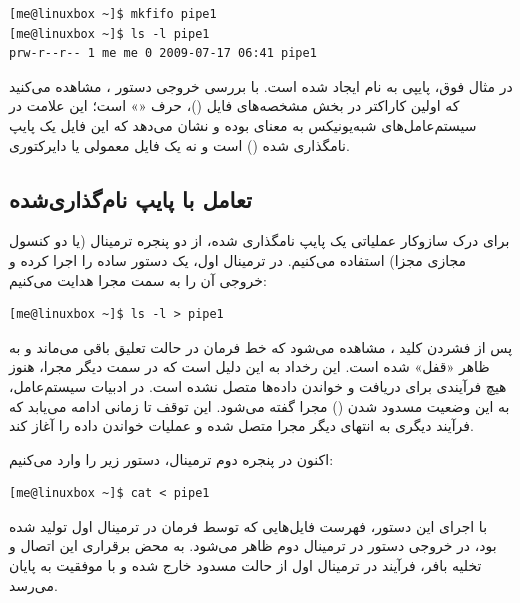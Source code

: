 \begin{latin}
\begin{lstlisting}
[me@linuxbox ~]$ mkfifo pipe1
[me@linuxbox ~]$ ls -l pipe1
prw-r--r-- 1 me me 0 2009-07-17 06:41 pipe1
\end{lstlisting}
\end{latin}

در مثال فوق، پایپی به نام  ایجاد شده است. با بررسی خروجی دستور ، مشاهده می‌کنید که اولین کاراکتر در بخش مشخصه‌های فایل ()، حرف «» است؛ این علامت در سیستم‌عامل‌های شبه‌یونیکس به معنای  بوده و نشان می‌دهد که این فایل یک پایپ نامگذاری شده () است و نه یک فایل معمولی یا دایرکتوری.

\subsection{تعامل با پایپ نام‌گذاری‌شده}

برای درک سازوکار عملیاتی یک پایپ نامگذاری شده، از دو پنجره ترمینال (یا دو کنسول مجازی مجزا) استفاده می‌کنیم. در ترمینال اول، یک دستور ساده را اجرا کرده و خروجی آن را به سمت مجرا هدایت می‌کنیم:

\begin{latin}
\begin{lstlisting}
[me@linuxbox ~]$ ls -l > pipe1

\end{lstlisting}
\end{latin}

پس از فشردن کلید ، مشاهده می‌شود که خط فرمان در حالت تعلیق باقی می‌ماند و به ظاهر «قفل» شده است. این رخداد به این دلیل است که در سمت دیگر مجرا، هنوز هیچ فرآیندی برای دریافت و خواندن داده‌ها متصل نشده است. در ادبیات سیستم‌عامل، به این وضعیت مسدود شدن () مجرا گفته می‌شود. این توقف تا زمانی ادامه می‌یابد که فرآیند دیگری به انتهای دیگر مجرا متصل شده و عملیات خواندن داده را آغاز کند.

اکنون در پنجره دوم ترمینال، دستور زیر را وارد می‌کنیم:

\begin{latin}
\begin{lstlisting}
[me@linuxbox ~]$ cat < pipe1
\end{lstlisting}
\end{latin}

با اجرای این دستور، فهرست فایل‌هایی که توسط فرمان  در ترمینال اول تولید شده بود، در خروجی دستور  در ترمینال دوم ظاهر می‌شود. به محض برقراری این اتصال و تخلیه بافر، فرآیند  در ترمینال اول از حالت مسدود خارج شده و با موفقیت به پایان می‌رسد.

